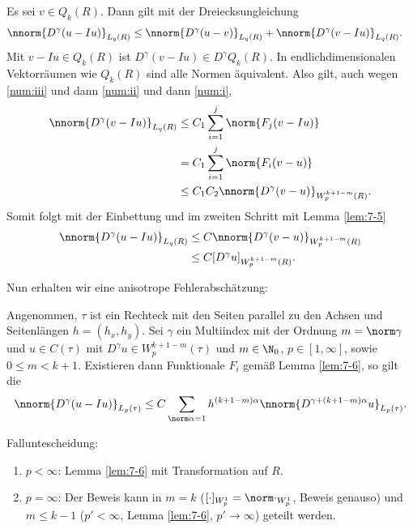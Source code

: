 \begin{beweis}
  Es sei $v \in Q_{k}(R)$. Dann gilt mit der Dreiecksungleichung
  \begin{align*}
    \nnorm{D^{\gamma}(u-Iu)}_{ L_{q}(R)}&\leq \nnorm{D^{\gamma}(u-v)}_{ L_{q}(R)} + \nnorm{D^{\gamma}(v-Iu)}_{ L_{q}(R)}. 
  \end{align*}
Mit $v - Iu \in Q_{k}(R)$ ist $D^{\gamma}(v - Iu)\in D^{\gamma}Q_{k}(R)$. In endlichdimensionalen Vektorräumen wie $Q_{k}(R)$ sind alle Normen äquivalent. Also gilt, auch wegen \ref{num:iii} und dann \ref{num:ii} und dann \ref{num:i},
\begin{align*}
  \nnorm{D^{\gamma}(v-Iu)}_{ L_{q}(R)} &\leq C_{1} \sum_{i = 1}^{j} \norm{F_{j}(v - Iu)}\\
&= C_{1} \sum_{i = 1}^{j} \norm{F_{i}(v - u)}\\
&\leq C_{1} C_{2} \nnorm{D^{\gamma}(v - u)}_{W_{p}^{k+1-m}(R)}. 
\end{align*}
Somit folgt mit der Einbettung und im zweiten Schritt mit Lemma \ref{lem:7-5}
\begin{align*}
    \nnorm{D^{\gamma}(u-Iu)}_{ L_{q}(R)}&\leq C \nnorm{D^{\gamma}(v-u)}_{W_{p}^{k+1-m}(R)}\\
    &\leq C [D^{\gamma}u]_{W_{p}^{k+1-m}(R)}. 
\end{align*}
\end{beweis}
Nun erhalten wir eine anisotrope Fehlerabschätzung:
\begin{satz}\label{thm:7-7}
  Angenommen, $\tau$ ist ein Rechteck mit den Seiten parallel zu den Achsen und Seitenlängen $h = (h_{x}, h_{y})$. Sei $\gamma$ ein Multiindex mit der Ordnung $m = \norm \gamma$ und $u \in C(\tau)$ mit $D^{\gamma} u \in W_{p}^{k+1-m}(\tau)$ und $m \in \N_{0}$, $p \in [1, \infty]$, sowie $0 \leq m < k+1$. Existieren dann Funktionale $F_{i}$ gemäß Lemma \ref{lem:7-6}, so gilt die 
  \begin{align*}
    \nnorm{D^{\gamma}(u - Iu)}_{L_{p}(\tau)} \leq C \sum_{\norm \alpha = 1} h^{(k+1-m)\alpha} \nnorm{D^{\gamma + (k+1-m)\alpha}u}_{L_{p}(\tau)}. 
  \end{align*}
\end{satz}

\begin{beweis}
Falluntescheidung:
\begin{enumerate}
\item $p < \infty$: Lemma \ref{lem:7-6} mit Transformation auf $R$. 
\item $p = \infty$: Der Beweis kann in $m = k$ ($[\cdot]_{W_{p}^{1}} = \norm \cdot _{W^{1}_{p}}$, Beweis genauso)
und $m \leq k-1$ ($p' < \infty$, Lemma \ref{lem:7-6}, $p' \to \infty$) geteilt werden.
\end{enumerate}
\end{beweis}

